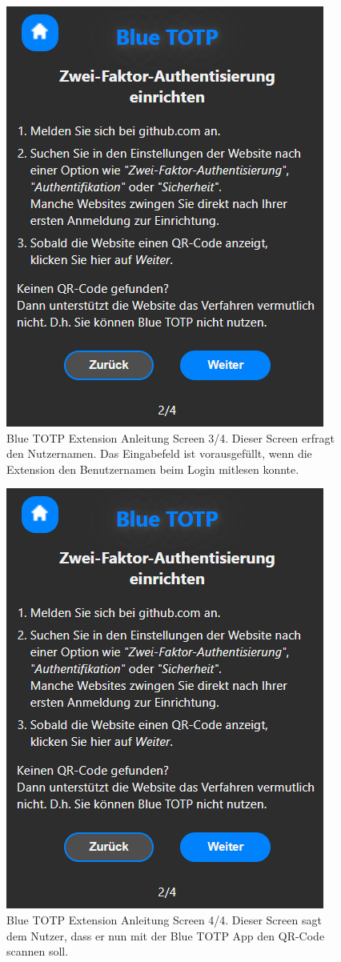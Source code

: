 \begin{figure}[H]
    \centering
    \includegraphics[width=0.5\linewidth]{figures/impl/ext_anleitung_2.png}
    \caption[Blue TOTP Extension Anleitung Screen 3/4]{Blue TOTP Extension Anleitung Screen 3/4. Dieser Screen erfragt den Nutzernamen. Das Eingabefeld ist vorausgefüllt, wenn die Extension den Benutzernamen beim Login mitlesen konnte.}
    \label{fig: blue totp ext screenshot anleitung 3}
\end{figure}

\begin{figure}[H]
    \centering
    \includegraphics[width=0.5\linewidth]{figures/impl/ext_anleitung_2.png}
    \caption[Blue TOTP Extension Anleitung Screen 4/4]{Blue TOTP Extension Anleitung Screen 4/4. Dieser Screen sagt dem Nutzer, dass er nun mit der Blue TOTP App den QR-Code scannen soll.}
    \label{fig: blue totp ext screenshot anleitung 4}
\end{figure}

